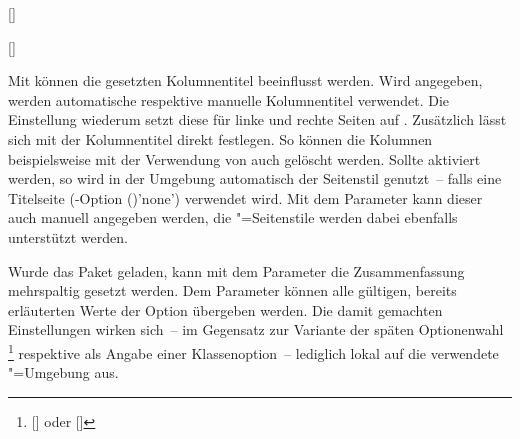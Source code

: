 \begin{Declaration*}{}
\begin{Declaration*}{}
\begin{Declaration*}{}
\begin{Declaration}{[]}
\begin{Declaration}{[]}
\begin{Declaration}{}
\begin{Declaration}[v2.02]{}
\begin{Declaration}[v2.02]{%
}
\begin{Declaration}{}
\begin{Declaration}{}{%
}
Mit  können die gesetzten Kolumnentitel 
beeinflusst werden. Wird  
angegeben, werden automatische respektive manuelle Kolumnentitel verwendet. Die 
Einstellung  wiederum setzt diese 
für linke und rechte Seiten auf . Zusätzlich lässt sich mit 
 der 
Kolumnentitel direkt festlegen. So können die Kolumnen beispielsweise mit der 
Verwendung von  auch 
gelöscht werden. Sollte  aktiviert 
werden, so wird in der Umgebung automatisch der Seitenstil  
genutzt~-- falls eine Titelseite
(\KOMAScript-Option ()'none') 
verwendet wird. Mit dem Parameter  kann 
dieser auch manuell angegeben werden, die "=Seitenstile 
werden dabei ebenfalls unterstützt werden.

Wurde das Paket  geladen, kann mit dem Parameter 
 die Zusammenfassung 
mehrspaltig gesetzt werden. Dem Parameter  
können alle gültigen, bereits erläuterten Werte der Option  
übergeben werden. Die damit gemachten Einstellungen wirken sich~-- im Gegensatz 
zur Variante der späten Optionenwahl%
\footnote{%
  [] oder
  []%
}
respektive als Angabe einer Klassenoption~-- lediglich lokal auf die verwendete 
"=Umgebung aus.


\end{Declaration}
\end{Declaration}
\end{Declaration}
\end{Declaration}
\end{Declaration}
\end{Declaration}
\end{Declaration}
\end{Declaration*}
\end{Declaration*}
\end{Declaration*}
